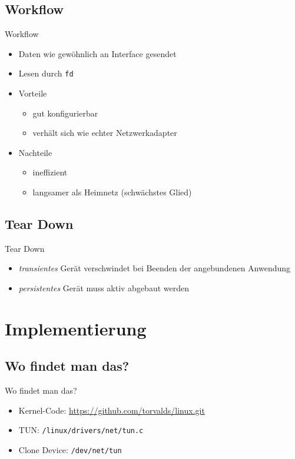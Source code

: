 \documentclass[ngerman,aspectratio=169]{beamer}
\begin{document}
	\subsection{Workflow}
	\begin{frame}{Workflow}
		\begin{itemize}
			\item Daten wie gewöhnlich an Interface gesendet
			\item Lesen durch \texttt{fd}
			
			\item Vorteile
			\begin{itemize}
				\item gut konfigurierbar
				\item verhält sich wie echter Netzwerkadapter
			\end{itemize}
			\item Nachteile
			\begin{itemize}
				\item ineffizient
				\item langsamer als Heimnetz (schwächstes Glied)
			\end{itemize}
		\end{itemize}
	\end{frame}

	\subsection{Tear Down}
	\begin{frame}{Tear Down}
		\begin{itemize}
			\item \emph{transientes} Gerät verschwindet bei Beenden der angebundenen Anwendung
			\item \emph{persistentes} Gerät muss aktiv abgebaut werden
		\end{itemize}
	\end{frame}

	\section{Implementierung}
	\subsection{Wo findet man das?}
	\begin{frame}{Wo findet man das?}
		\begin{itemize}
			\item Kernel-Code: \url{https://github.com/torvalds/linux.git}
			\item TUN: \texttt{/linux/drivers/net/tun.c}
			\item Clone Device: \texttt{/dev/net/tun}
		\end{itemize}
	\end{frame}
	
\end{document}

